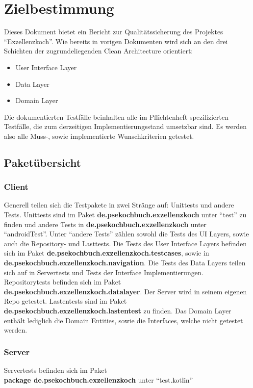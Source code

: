 \chapter{Zielbestimmung}

Dieses Dokument bietet ein Bericht zur Qualitätssicherung des Projektes "`Exzellenzkoch"'. Wie bereits in vorigen Dokumenten wird sich an den drei Schichten der zugrundeliegenden Clean Architecture orientiert:
\begin{itemize}
	\item User Interface Layer
	\item Data Layer
	\item Domain Layer
\end{itemize}
Die dokumentierten Testfälle beinhalten alle im Pflichtenheft spezifizierten Testfälle, die zum derzeitigen Implementierungsstand umsetzbar sind. Es werden also alle Muss-, sowie implementierte Wunschkriterien getestet.

\section{Paketübersicht}
\subsection{Client}
Generell teilen sich die Testpakete in zwei Stränge auf: Unittests und andere Tests.
Unittests sind im Paket \textbf{de.psekochbuch.exzellenzkoch} unter "`test"' zu finden und andere Tests in \textbf{de.psekochbuch.exzellenzkoch} unter "`androidTest"'. 
Unter "`andere Tests"' zählen sowohl die Tests des UI Layers, sowie auch die Repository- und Lasttests.
Die Tests des User Interface Layers befinden sich im Paket \textbf{de.psekochbuch.exzellenzkoch.testcases}, sowie in \textbf{de.psekochbuch.exzellenzkoch.navigation}.
Die Tests des Data Layers teilen sich auf in Servertests und Tests der Interface Implementierungen.
Repositorytests befinden sich im Paket
\textbf{de.psekochbuch.exzellenzkoch.datalayer}.
Der Server wird in seinem eigenen Repo getestet.
Lastentests sind im Paket \textbf{de.psekochbuch.exzellenzkoch.lastentest} zu finden.
Das Domain Layer enthält lediglich die Domain Entities, sowie die Interfaces, welche nicht getestet werden.

\subsection{Server}
Servertests befinden sich im Paket \\
\textbf{package de.psekochbuch.exzellenzkoch} unter "`test.kotlin"'